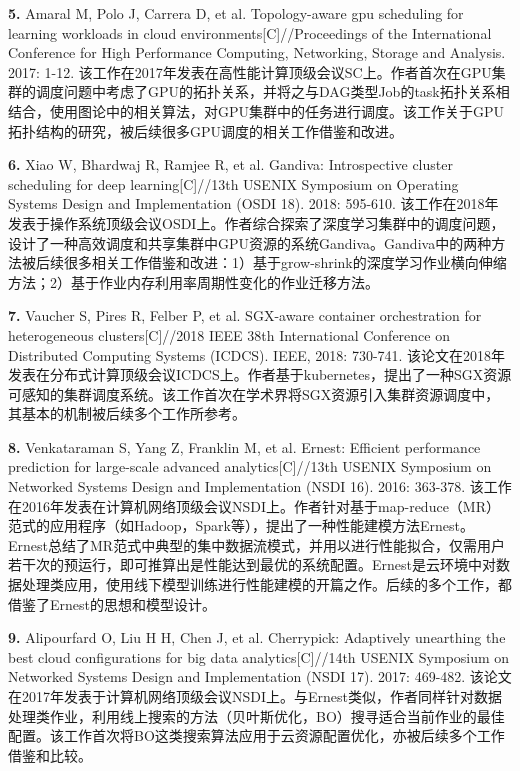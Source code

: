 \textbf{5. }Amaral M, Polo J, Carrera D, et al. Topology-aware gpu scheduling for learning workloads in cloud environments[C]//Proceedings of the International Conference for High Performance Computing, Networking, Storage and Analysis. 2017: 1-12. 该工作在2017年发表在高性能计算顶级会议SC上。作者首次在GPU集群的调度问题中考虑了GPU的拓扑关系，并将之与DAG类型Job的task拓扑关系相结合，使用图论中的相关算法，对GPU集群中的任务进行调度。该工作关于GPU拓扑结构的研究，被后续很多GPU调度的相关工作\parencite{zhao2020hived}借鉴和改进。

\textbf{6. }Xiao W, Bhardwaj R, Ramjee R, et al. Gandiva: Introspective cluster scheduling for deep learning[C]//13th {USENIX} Symposium on Operating Systems Design and Implementation ({OSDI} 18). 2018: 595-610. 该工作在2018年发表于操作系统顶级会议OSDI上。作者综合探索了深度学习集群中的调度问题，设计了一种高效调度和共享集群中GPU资源的系统Gandiva。Gandiva中的两种方法被后续很多相关工作\parencite{yu2020salus,10.1145/3437984.3458837}借鉴和改进：1）基于grow-shrink的深度学习作业横向伸缩方法；2）基于作业内存利用率周期性变化的作业迁移方法。

\textbf{7. }Vaucher S, Pires R, Felber P, et al. SGX-aware container orchestration for heterogeneous clusters[C]//2018 IEEE 38th International Conference on Distributed Computing Systems (ICDCS). IEEE, 2018: 730-741. 该论文在2018年发表在分布式计算顶级会议ICDCS上。作者基于kubernetes，提出了一种SGX资源可感知的集群调度系统。该工作首次在学术界将SGX资源引入集群资源调度中，其基本的机制被后续多个工作\parencite{ma2020s3ml}所参考。

\textbf{8. }Venkataraman S, Yang Z, Franklin M, et al. Ernest: Efficient performance prediction for large-scale advanced analytics[C]//13th {USENIX} Symposium on Networked Systems Design and Implementation ({NSDI} 16). 2016: 363-378. 该工作在2016年发表在计算机网络顶级会议NSDI上。作者针对基于map-reduce（MR）范式的应用程序（如Hadoop，Spark等），提出了一种性能建模方法Ernest。Ernest总结了MR范式中典型的集中数据流模式，并用以进行性能拟合，仅需用户若干次的预运行，即可推算出是性能达到最优的系统配置。Ernest是云环境中对数据处理类应用，使用线下模型训练进行性能建模的开篇之作。后续的多个工作\parencite{yadwadkar2017selecting,klimovic2018selecta,moradi2019performance,zheng2019online}，都借鉴了Ernest的思想和模型设计。

\textbf{9. }Alipourfard O, Liu H H, Chen J, et al. Cherrypick: Adaptively unearthing the best cloud configurations for big data analytics[C]//14th {USENIX} Symposium on Networked Systems Design and Implementation ({NSDI} 17). 2017: 469-482. 该论文在2017年发表于计算机网络顶级会议NSDI上。与Ernest类似，作者同样针对数据处理类作业，利用线上搜索的方法（贝叶斯优化，BO）搜寻适合当前作业的最佳配置。该工作首次将BO这类搜索算法应用于云资源配置优化，亦被后续多个工作\parencite{casimiro2019lynceus}借鉴和比较。

